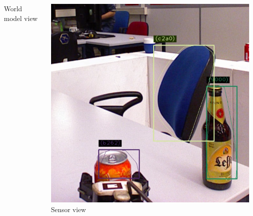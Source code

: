 \documentclass[t]{beamer}
\begin{document}
\begin{frame}
\begin{columns}
\begin{column}{0.33\textwidth}
\begin{center}
				World model view
			\end{center}		
		\end{column}
		\begin{column}{0.33\textwidth}
			\begin{center}
				\includegraphics[width=1\linewidth]{Figures/pick_up_kinect_view}\\
				Sensor view
			\end{center}		
		\end{column}				
	\end{columns}
\end{frame}
\end{document}

